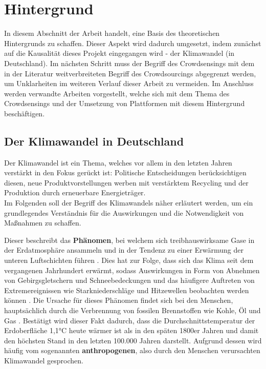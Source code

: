 \chapter{Hintergrund} %
In diesem Abschnitt der Arbeit handelt, eine Basis des theoretischen Hintergrunds zu schaffen. Dieser Aspekt wird dadurch umgesetzt, indem zunächst auf die Kausalität dieses Projekt eingegangen wird - der Klimawandel (in Deutschland). Im nächsten Schritt muss der Begriff des Crowdsensings mit dem in der Literatur weitverbreiteten Begriff des Crowdsourcings abgegrenzt werden, um Unklarheiten im weiteren Verlauf dieser Arbeit zu vermeiden. Im Anschluss werden verwandte Arbeiten vorgestellt, welche sich mit dem Thema des Crowdsensings und der Umsetzung von Plattformen mit diesem Hintergrund beschäftigen.

\section{Der Klimawandel in Deutschland}
Der Klimawandel ist ein Thema, welches vor allem in den letzten Jahren verstärkt in den Fokus gerückt ist: Politische Entscheidungen berücksichtigen diesen, neue Produktvorstellungen werben mit verstärktem Recycling und der Produktion durch erneuerbare Energieträger. \\ Im Folgenden soll der Begriff des Klimawandels näher erläutert werden, um ein grundlegendes Verständnis für die Auswirkungen und die Notwendigkeit von Maßnahmen zu schaffen.

Dieser beschreibt das \textbf{Phänomen}, bei welchem sich treibhauswirksame Gase in der Erdatmosphäre ansammeln und in der Tendenz zu einer Erwärmung der unteren Luftschichten führen \cite{UmweltbundesamtKlimawandel}. Dies hat zur Folge, dass sich das Klima seit dem vergangenen Jahrhundert erwärmt, sodass Auswirkungen in Form von Abnehmen von Gebirgsgletschern und Schneebedeckungen und das häufigere Auftreten von Extremereignissen wie Starkniederschläge und Hitzewellen beobachten werden können \cite{UmweltbundesamtKlimawandel}. Die Ursache für dieses Phänomen findet sich bei den Menschen, hauptsächlich durch die Verbrennung von fossilen Brennstoffen wie Kohle, Öl und Gas \cite{UnitedNationsClimateChange}. Bestätigt wird dieser Fakt dadurch, dass die Durchschnittstemperatur der Erdoberfläche 1,1°C heute wärmer ist als in den späten 1800er Jahren und damit den höchsten Stand in den letzten 100.000 Jahren \cite{UnitedNationsClimateChange} darstellt. Aufgrund dessen wird häufig vom sogenannten \textbf{anthropogenen}, also durch den Menschen verursachten Klimawandel gesprochen.

